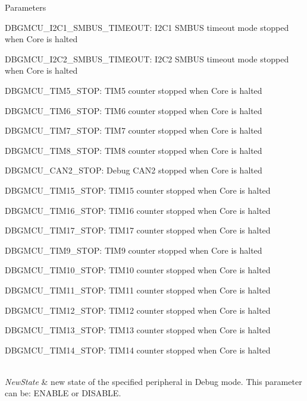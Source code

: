 \begin{DoxyParams}{Parameters}
\begin{DoxyItemize}
\item D\+B\+G\+M\+C\+U\+\_\+\+I2\+C1\+\_\+\+S\+M\+B\+U\+S\+\_\+\+T\+I\+M\+E\+O\+UT\+: I2\+C1 S\+M\+B\+US timeout mode stopped when Core is halted \item D\+B\+G\+M\+C\+U\+\_\+\+I2\+C2\+\_\+\+S\+M\+B\+U\+S\+\_\+\+T\+I\+M\+E\+O\+UT\+: I2\+C2 S\+M\+B\+US timeout mode stopped when Core is halted \item D\+B\+G\+M\+C\+U\+\_\+\+T\+I\+M5\+\_\+\+S\+T\+OP\+: T\+I\+M5 counter stopped when Core is halted\end{DoxyItemize}
\begin{DoxyItemize}
\item D\+B\+G\+M\+C\+U\+\_\+\+T\+I\+M6\+\_\+\+S\+T\+OP\+: T\+I\+M6 counter stopped when Core is halted\end{DoxyItemize}
\begin{DoxyItemize}
\item D\+B\+G\+M\+C\+U\+\_\+\+T\+I\+M7\+\_\+\+S\+T\+OP\+: T\+I\+M7 counter stopped when Core is halted\end{DoxyItemize}
\begin{DoxyItemize}
\item D\+B\+G\+M\+C\+U\+\_\+\+T\+I\+M8\+\_\+\+S\+T\+OP\+: T\+I\+M8 counter stopped when Core is halted \item D\+B\+G\+M\+C\+U\+\_\+\+C\+A\+N2\+\_\+\+S\+T\+OP\+: Debug C\+A\+N2 stopped when Core is halted \item D\+B\+G\+M\+C\+U\+\_\+\+T\+I\+M15\+\_\+\+S\+T\+OP\+: T\+I\+M15 counter stopped when Core is halted \item D\+B\+G\+M\+C\+U\+\_\+\+T\+I\+M16\+\_\+\+S\+T\+OP\+: T\+I\+M16 counter stopped when Core is halted \item D\+B\+G\+M\+C\+U\+\_\+\+T\+I\+M17\+\_\+\+S\+T\+OP\+: T\+I\+M17 counter stopped when Core is halted\end{DoxyItemize}
\begin{DoxyItemize}
\item D\+B\+G\+M\+C\+U\+\_\+\+T\+I\+M9\+\_\+\+S\+T\+OP\+: T\+I\+M9 counter stopped when Core is halted \item D\+B\+G\+M\+C\+U\+\_\+\+T\+I\+M10\+\_\+\+S\+T\+OP\+: T\+I\+M10 counter stopped when Core is halted \item D\+B\+G\+M\+C\+U\+\_\+\+T\+I\+M11\+\_\+\+S\+T\+OP\+: T\+I\+M11 counter stopped when Core is halted \item D\+B\+G\+M\+C\+U\+\_\+\+T\+I\+M12\+\_\+\+S\+T\+OP\+: T\+I\+M12 counter stopped when Core is halted \item D\+B\+G\+M\+C\+U\+\_\+\+T\+I\+M13\+\_\+\+S\+T\+OP\+: T\+I\+M13 counter stopped when Core is halted \item D\+B\+G\+M\+C\+U\+\_\+\+T\+I\+M14\+\_\+\+S\+T\+OP\+: T\+I\+M14 counter stopped when Core is halted \end{DoxyItemize}
\\
\hline
{\em New\+State} & new state of the specified peripheral in Debug mode. This parameter can be\+: E\+N\+A\+B\+LE or D\+I\+S\+A\+B\+LE. \\
\hline
\end{DoxyParams}

